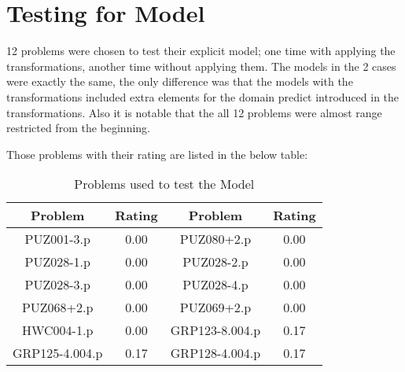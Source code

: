\section{Testing for Model}

12 problems were chosen to test their explicit model; one time with applying the transformations, another time without applying them. The models in the 2 cases were exactly the same, the only difference was that the models with the transformations included extra elements for the domain predict introduced in the transformations. Also it is notable that the all 12 problems were almost range restricted from the beginning.

Those problems with their rating are listed in the below table:

\begin{table}[H]
	\centering
	\begin{tabular}{|| c | c || c | c ||}
		\toprule
		Problem & Rating & Problem & Rating \\
		\midrule
		PUZ001-3.p      &  0.00  &  PUZ080+2.p      &  0.00 \\		
		PUZ028-1.p      &  0.00  &  PUZ028-2.p      &  0.00 \\
		PUZ028-3.p      &  0.00  &  PUZ028-4.p      &  0.00 \\
		PUZ068+2.p      &  0.00  &  PUZ069+2.p      &  0.00 \\
		HWC004-1.p      &  0.00  &  GRP123-8.004.p  &  0.17 \\
		GRP125-4.004.p  &  0.17  &  GRP128-4.004.p  &  0.17 \\		
		\bottomrule
	\end{tabular}
	\caption{Problems used to test the Model}
	\label{table:mode_with_&_without}
\end{table}






